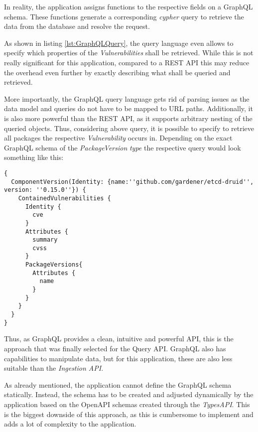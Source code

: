 In reality, the application assigns functions to the respective fields on a GraphQL schema. These functions generate a corresponding \emph{cypher} query to retrieve the data from the database and resolve the request.\par
As shown in listing \ref{lst:GraphQLQuery}, the query language even allows to specify which properties of the \emph{Vulnerabilities} shall be retrieved. While this is not really significant for this application, compared to a REST API this may reduce the overhead even further by exactly describing what shall be queried and retrieved.\par 
More importantly, the GraphQL query language gets rid of parsing issues as the data model and queries do not have to be mapped to URL paths. Additionally, it is also more powerful than the REST API, as it supports arbitrary nesting of the queried objects. Thus, considering above query, it is possible to specify to retrieve all packages the respective \emph{Vulnerability} occurs in. Depending on the exact GraphQL schema of the \emph{PackageVersion} \emph{type} the respective query would look something like this:

\begin{lstlisting}[basicstyle=\tiny, caption=Nested GraphQL Query, captionpos=b, label=lst:NestedGraphQLQuery]
{
  ComponentVersion(Identity: {name:''github.com/gardener/etcd-druid'', version: ''0.15.0''}) {
    ContainedVulnerabilities {
      Identity {
        cve
      }
      Attributes {
        summary
        cvss 
      }
      PackageVersions{
        Attributes {
          name
        }
      }
    }
  }
}
\end{lstlisting}

Thus, as GraphQL provides a clean, intuitive and powerful API, this is the approach that was finally selected for the Query API. GraphQL also has capabilities to manipulate data, but for this application, these are also less suitable than the \emph{Ingestion API}.\par
As already mentioned, the application cannot define the GraphQL schema statically. Instead, the schema has to be created and adjusted dynamically by the application based on the OpenAPI schemas created through the \emph{TypesAPI}. This is the biggest downside of this approach, as this is cumbersome to implement and adds a lot of complexity to the application.

